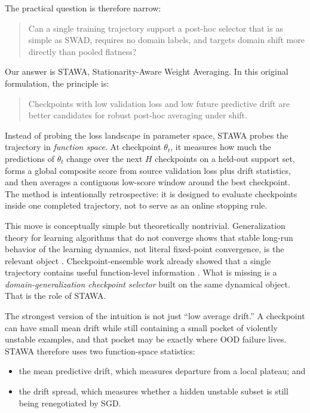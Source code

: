 \documentclass{article}
\newcommand{\ood}{OOD}
\newcommand{\stawa}{\textup{\textsc{STAWA}}}
\newcommand{\swad}{\textup{\textsc{SWAD}}}
\begin{document}
The practical question is therefore narrow:
\begin{quote}
Can a single training trajectory support a post-hoc selector that is as simple as \swad{}, requires no domain labels, and targets domain shift more directly than pooled flatness?
\end{quote}

Our answer is \stawa{}, Stationarity-Aware Weight Averaging. In this original formulation, the principle is:
\begin{quote}
    Checkpoints with low validation loss and low future predictive drift are better candidates for robust post-hoc averaging under shift.
\end{quote}
Instead of probing the loss landscape in parameter space, \stawa{} probes the trajectory in \emph{function space}. At checkpoint $\theta_t$, it measures how much the predictions of $\theta_t$ change over the next $H$ checkpoints on a held-out support set, forms a global composite score from source validation loss plus drift statistics, and then averages a contiguous low-score window around the best checkpoint. The method is intentionally retrospective: it is designed to evaluate checkpoints inside one completed trajectory, not to serve as an online stopping rule.

This move is conceptually simple but theoretically nontrivial. Generalization theory for learning algorithms that do not converge shows that stable long-run behavior of the learning dynamics, not literal fixed-point convergence, is the relevant object \citep{chandramoorthy2022nonconvergent}. Checkpoint-ensemble work already showed that a single trajectory contains useful function-level information \citep{chen2017checkpoint}. What is missing is a \emph{domain-generalization checkpoint selector} built on the same dynamical object. That is the role of \stawa{}.

The strongest version of the intuition is not just ``low average drift.'' A checkpoint can have small mean drift while still containing a small pocket of violently unstable examples, and that pocket may be exactly where \ood{} failure lives. \stawa{} therefore uses two function-space statistics:
\begin{itemize}[leftmargin=1.4em]
    \item the mean predictive drift, which measures departure from a local plateau; and
    \item the drift spread, which measures whether a hidden unstable subset is still being renegotiated by SGD.
\end{itemize}
\end{document}
